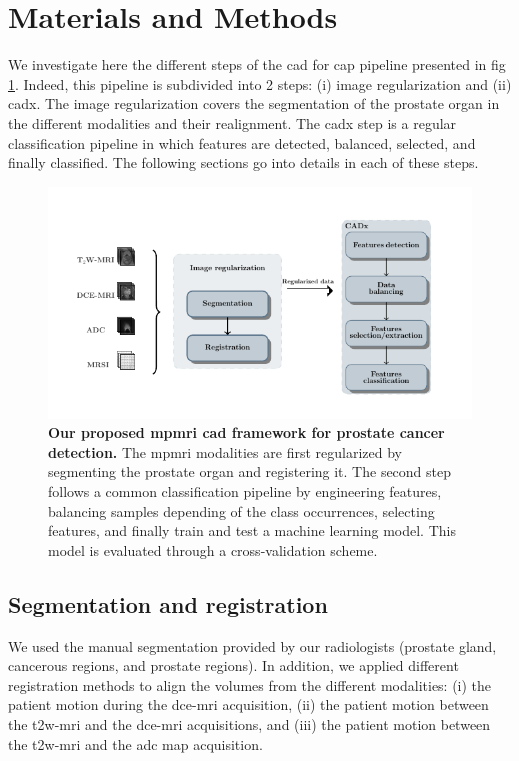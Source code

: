 \documentclass[final,3p,times,twocolumn]{elsarticle}
\begin{document}
\section{Materials and Methods}\label{sec:materials_and_methods}

We investigate here the different steps of the \ac{cad} for \ac{cap} pipeline
presented in \acs{fig}\,\ref{fig:wkfcad}. Indeed, this pipeline is
subdivided into 2 steps: (i) image regularization and (ii) \ac{cadx}. The image
regularization covers the segmentation of the prostate organ in the
different modalities and their realignment. The \ac{cadx} step is a regular
classification pipeline in which features are detected, balanced, selected, and
finally classified. The following sections go into details in each of these
steps.

\begin{figure}
  \centering
  \includegraphics[width=1.0\linewidth]{./images/cad/wkfcad.pdf}
  \caption{\textbf{Our proposed \ac{mpmri} \ac{cad} framework for prostate cancer
    detection.} The \ac{mpmri} modalities are first regularized by segmenting
  the prostate organ and registering it. The second step follows a common
  classification pipeline by engineering features, balancing samples depending of
  the class occurrences, selecting features, and finally train and test a machine
  learning model. This model is evaluated through a cross-validation scheme.}
  \label{fig:wkfcad}
\end{figure}

\subsection{Segmentation and registration}

We used the manual segmentation provided by our radiologists (prostate gland,
cancerous regions, and prostate regions). In addition, we applied different
registration methods to align the volumes from the different modalities: (i)
the patient motion during the \ac{dce}-\ac{mri} acquisition, (ii) the patient
motion between the \ac{t2w}-\ac{mri} and the \ac{dce}-\ac{mri} acquisitions,
and (iii) the patient motion between the \ac{t2w}-\ac{mri} and the \ac{adc} map
acquisition.
\end{document}
